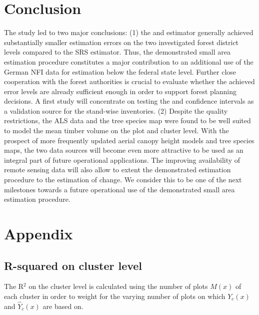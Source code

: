 
\section{Conclusion}
\label{sec:concl}

The study led to two major conclusions: (1) the \extpsynth{} and \psmall{} estimator generally achieved substantially smaller estimation errors on the two investigated forest district levels compared to the SRS estimator. Thus, the demonstrated small area estimation procedure constitutes a major contribution to an additional use of the German NFI data for estimation below the federal state level. Further close cooperation with the forest authorities is crucial to evaluate whether the achieved error levels are already sufficient enough in order to support forest planning decisions. A first study will concentrate on testing the \extpsynth{} and \psmall{} confidence intervals as a validation source for the stand-wise inventories. (2) Despite the quality restrictions, the ALS data and the tree species map were found to be well suited to model the mean timber volume on the plot and cluster level. With the prospect of more frequently updated aerial canopy height models and tree species maps, the two data sources will become even more attractive to be used as an integral part of future operational applications. The improving availability of remote sensing data will also allow to extent the demonstrated estimation procedure to the estimation of change. We consider this to be one of the next milestones towards a future operational use of the demonstrated small area estimation procedure.


\section{Appendix}
\label{sec:appendix_saerlp}

\subsection*{R-squared on cluster level}

The R$^2$ on the cluster level is calculated using the number of plots $M(x)$ of each cluster in order to weight for the varying number of plots on which $Y_c(x)$ and $\hat{Y}_{c}(x)$ are based on. 

